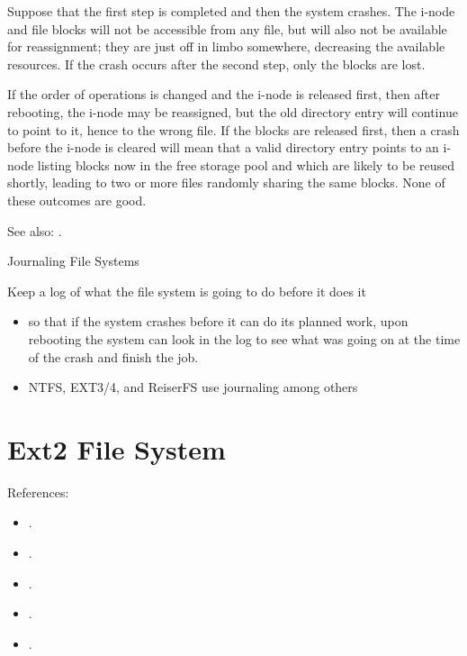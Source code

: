 Suppose that the first step is completed and then the system crashes. The i-node and file
blocks will not be accessible from any file, but will also not be available for
reassignment; they are just off in limbo somewhere, decreasing the available resources. If
the crash occurs after the second step, only the blocks are lost.

If the order of operations is changed and the i-node is released first, then after
rebooting, the i-node may be reassigned, but the old directory entry will continue to
point to it, hence to the wrong file. If the blocks are released first, then a crash
before the i-node is cleared will mean that a valid directory entry points to an i-node
listing blocks now in the free storage pool and which are likely to be reused shortly,
leading to two or more files randomly sharing the same blocks. None of these outcomes are
good.

See also: .

\begin{frame}{Journaling File Systems}
    \begin{block}{Keep a log of what the file system is going to do before it does it}
    \begin{itemize}
    \item so that if the system crashes before it can do its planned work, upon rebooting
      the system can look in the log to see what was going on at the time of the crash and
      finish the job.
    \item NTFS, EXT3/4, and ReiserFS use journaling among others
    \end{itemize}
  \end{block}
\end{frame}

\section{Ext2 File System}

References:
\begin{itemize}
\item {}.
\item {}.
\item {}.
\item {}.
\item {}.
\end{itemize}

